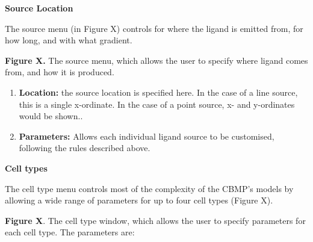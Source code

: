 \documentclass[12pt,a4paper]{report}
\begin{document}
{\bfseries Source Location}

The source menu (in Figure X) controls for where the ligand is emitted 
from, for how long, and with what gradient.



\begin{figure}[H]
\centering
\end{figure}


{\bfseries Figure X. }The source menu, which allows the user to specify 
where ligand comes from, and how it is produced.

\begin{enumerate}
\item {\bfseries Location: }the source location is specified here. In the 
case of a line source, this is a single x-ordinate. In the case of a 
point source, x- and y-ordinates would be shown..
\item {\bfseries Parameters: }Allows each individual ligand source to be 
customised, following the rules described above.
\setcounter{numberedCntB}{\theenumi}
\end{enumerate}




{\bfseries Cell types}

The cell type menu controls most of the complexity of the CBMP's models 
by allowing a wide range of parameters for up to four cell types (Figure 
X). 

\begin{figure}[H]
\centering
\end{figure}


{\bfseries Figure X}. The cell type window, which allows the user to 
specify parameters for each cell type. The parameters are:
\end{document}
